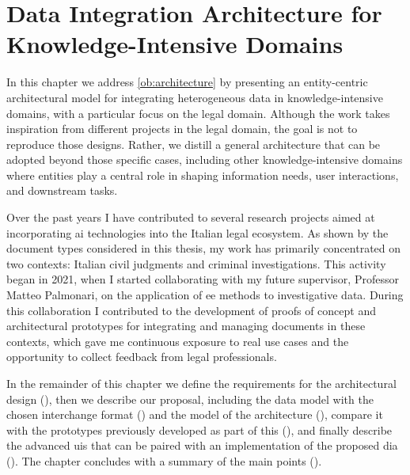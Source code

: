 \chapter[Data Integration Architecture for Knowledge-Intensive Domains][Data Integration Architecture]{Data Integration Architecture for Knowledge-Intensive Domains}
\label{chap:architecture}

In this chapter we address \ref{ob:architecture} by presenting an entity-centric architectural model for integrating heterogeneous data in knowledge-intensive domains, with a particular focus on the legal domain.
Although the work takes inspiration from different projects in the legal domain, the goal is not to reproduce those designs. Rather, we distill a general architecture that can be adopted beyond those specific cases, including other knowledge-intensive domains where entities play a central role in shaping information needs, user interactions, and downstream tasks.



Over the past years I have contributed to several research projects aimed at incorporating \acf{ai} technologies into the Italian legal ecosystem. As shown by the document types considered in this thesis, my work has primarily concentrated on two contexts: Italian civil judgments and criminal investigations. This activity began in 2021, when I started collaborating with my future \phd supervisor, Professor Matteo Palmonari, on the application of \acl{ee} methods to investigative data.
%
During this collaboration I contributed to the development of proofs of concept and architectural prototypes for integrating and managing documents in these contexts, which gave me continuous exposure to real use cases and the opportunity to collect feedback from legal professionals.



In the remainder of this chapter we define the requirements for the architectural design (), then we describe our proposal, including the data model with the chosen interchange format () and the model of the architecture (), compare it with the prototypes previously developed as part of this \phd{} (), and finally describe the advanced \acfp{ui} that can be paired with an implementation of the proposed \acf{dia} (). The chapter concludes with a summary of the main points ().




